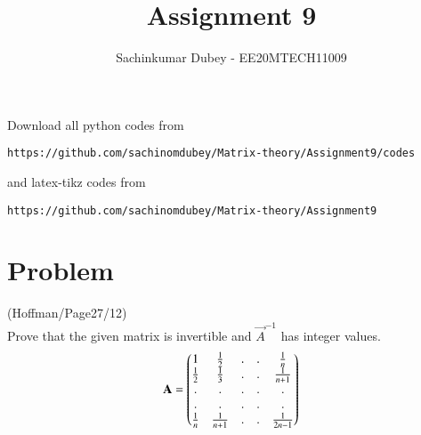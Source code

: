 \documentclass[journal,12pt,twocolumn]{IEEEtran}
\begin{document}
\def\putbox#1#2#3{\makebox[0in][l]{\makebox[#1][l]{}\raisebox{\baselineskip}[0in][0in]{\raisebox{#2}[0in][0in]{#3}}}}
     \def\rightbox#1{\makebox[0in][r]{#1}}
     \def\centbox#1{\makebox[0in]{#1}}
     \def\topbox#1{\raisebox{-\baselineskip}[0in][0in]{#1}}
     \def\midbox#1{\raisebox{-0.5\baselineskip}[0in][0in]{#1}}
\vspace{3cm}
\title{Assignment 9}
\author{Sachinkumar Dubey - EE20MTECH11009}
\maketitle
\newpage
\bigskip
\renewcommand{\thefigure}{\theenumi}
\renewcommand{\thetable}{\theenumi}
Download all python codes from 
\begin{lstlisting}
https://github.com/sachinomdubey/Matrix-theory/Assignment9/codes
\end{lstlisting}
%
and latex-tikz codes from 
%
\begin{lstlisting}
https://github.com/sachinomdubey/Matrix-theory/Assignment9
\end{lstlisting}
\section{Problem}
(Hoffman/Page27/12)\\ Prove that the given matrix is invertible and $\vec{A}^{-1}$ has integer values.
\begin{align}
    \mathbf{A}=\begin{pmatrix}1 & \tfrac{1}{2} &.&.&\tfrac{1}{n}\\
    \tfrac{1}{2} & \tfrac{1}{3} &.&.&\tfrac{1}{n+1}\\
    .&.&.&.&.\\.&.&.&.&.\\\tfrac{1}{n} & \tfrac{1}{n+1} &.&.&\tfrac{1}{2n-1}\end{pmatrix} \label{eq1}
\end{align}
\end{document}
